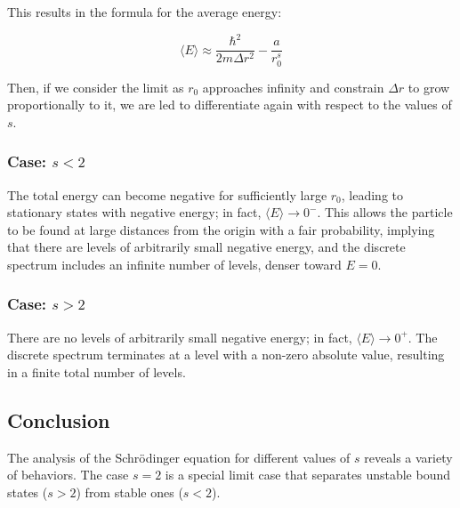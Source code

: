 This results in the formula for the average energy:

\begin{equation*}
    \langle E \rangle \approx \frac{\hbar^2}{2 m \Delta r^2} - \frac{a}{r_0^s}
\end{equation*}

\noindent
Then, if we consider the limit as $r_0$ approaches infinity and constrain $\Delta r$ to grow proportionally to it, we are led to differentiate again with respect to the values of $s$.

\subsubsection{Case: \(s < 2\)}
The total energy can become negative for sufficiently large \(r_0\), leading to stationary states with negative energy; in fact, \( \langle E \rangle \to 0^-\). This allows the particle to be found at large distances from the origin with a fair probability, implying that there are levels of arbitrarily small negative energy, and the discrete spectrum includes an infinite number of levels, denser toward \(E = 0\).

\subsubsection{Case: \(s > 2\)}
There are no levels of arbitrarily small negative energy; in fact, \( \langle E \rangle \rightarrow 0^+\). The discrete spectrum terminates at a level with a non-zero absolute value, resulting in a finite total number of levels.


\subsection*{Conclusion}
The analysis of the Schrödinger equation for different values of \(s\) reveals a variety of behaviors. The case \(s = 2\) is a special limit case that separates unstable bound states (\(s > 2\)) from stable ones (\(s < 2\)).

